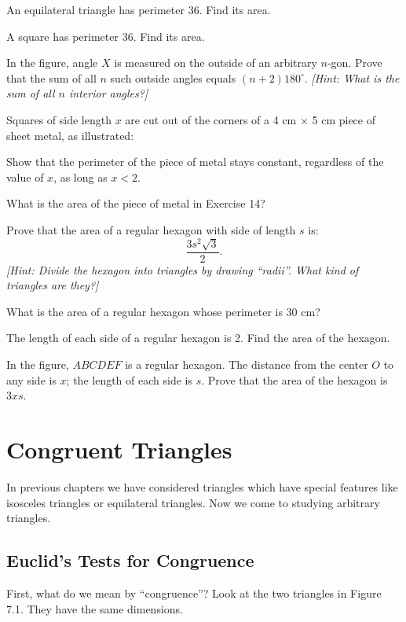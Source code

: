 \documentclass[12pt]{book} %
\begin{document}
\begin{ExerciseList}
\Exercise An equilateral triangle has perimeter 36. Find its area.

\Exercise A square has perimeter 36. Find its area.

\Exercise In the figure, angle $X$ is measured on the outside of an arbitrary $n$-gon. Prove that the sum of all $n$ such outside angles equals $(n+2)180^\circ$. \textit{[Hint: What is the sum of all $n$ interior angles?]}


\Exercise Squares of side length $x$ are cut out of the corners of a 4 cm $\times$ 5 cm piece of sheet metal, as illustrated:


Show that the perimeter of the piece of metal stays constant, regardless of the value of $x$, as long as $x<2$.

\Exercise What is the area of the piece of metal in Exercise 14?

\Exercise Prove that the area of a regular hexagon with side of length $s$ is:
\[
\frac{3s^2\sqrt{3}}{2}.
\]
\textit{[Hint: Divide the hexagon into triangles by drawing ``radii''. What kind of triangles are they?]}

\Exercise What is the area of a regular hexagon whose perimeter is 30 cm?

\Exercise The length of each side of a regular hexagon is 2. Find the area of the hexagon.

\Exercise In the figure, $ABCDEF$ is a regular hexagon. The distance from the center $O$ to any side is $x$; the length of each side is $s$. Prove that the area of the hexagon is $3xs$.

\end{ExerciseList}

\chapter{Congruent Triangles}

In previous chapters we have considered triangles which have special features like isosceles triangles or equilateral triangles. Now we come to studying arbitrary triangles.

\section{Euclid's Tests for Congruence}

First, what do we mean by ``congruence''? Look at the two triangles in Figure 7.1. They have the same dimensions.
\end{document}
